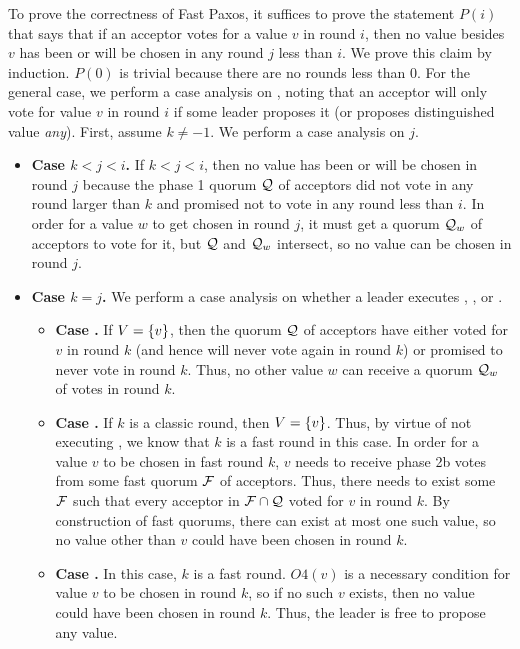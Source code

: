 To prove the correctness of Fast Paxos, it suffices to prove the statement
$P(i)$ that says that if an acceptor votes for a value $v$ in round $i$, then
no value besides $v$ has been or will be chosen in any round $j$ less than $i$.
We prove this claim by induction. $P(0)$ is trivial because there are no rounds
less than $0$. For the general case, we perform a case analysis on
, noting that an acceptor will only vote for value $v$ in
round $i$ if some leader proposes it (or proposes distinguished value
\emph{any}). First, assume $k \neq -1$. We perform a case analysis on $j$.
\begin{itemize}
  \item \textbf{Case $k < j < i$.}
    If $k < j < i$, then no value has been or will be chosen in round $j$
    because the phase 1 quorum $\mathcal{Q}$ of acceptors did not vote in any round
    larger than $k$ and promised not to vote in any round less than $i$. In
    order for a value $w$ to get chosen in round $j$, it must get a quorum
    $\mathcal{Q}_w$ of acceptors to vote for it, but $\mathcal{Q}$ and $\mathcal{Q}_w$
    intersect, so no value can be chosen in round $j$.

  \item \textbf{Case $k = j$.}
    We perform a case analysis on whether a leader executes
    , , or
    .
    \begin{itemize}
      \item \textbf{Case .}
        If $V = \{v\}$, then the quorum $\mathcal{Q}$ of acceptors have either
        voted for $v$ in round $k$ (and hence will never vote again in round
        $k$) or promised to never vote in round $k$. Thus, no other value $w$
        can receive a quorum $\mathcal{Q}_w$ of votes in round $k$.
      \item \textbf{Case .}
        If $k$ is a classic round, then $V = \{v\}$. Thus, by virtue of not
        executing , we know that $k$ is a fast
        round in this case. In order for a value $v$ to be chosen in fast round
        $k$, $v$ needs to receive phase 2b votes from some fast quorum
        $\mathcal{F}$ of acceptors. Thus, there needs to exist some
        $\mathcal{F}$ such that every acceptor in $\mathcal{F} \cap \mathcal{Q}$
        voted for $v$ in round $k$. By construction of fast quorums, there can
        exist at most one such value, so no value other than $v$ could have
        been chosen in round $k$.
      \item \textbf{Case .}
        In this case, $k$ is a fast round. $O4(v)$ is a necessary condition for
        value $v$ to be chosen in round $k$, so if no such $v$ exists, then no
        value could have been chosen in round $k$. Thus, the leader is free to
        propose any value.
    \end{itemize}


\end{itemize}
